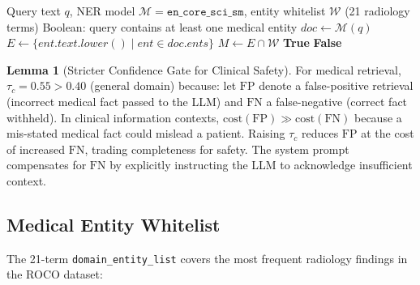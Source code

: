 \documentclass[12pt,a4paper]{article}
\theoremstyle{definition}
\newtheorem{lemma}[theorem]{Lemma}
\theoremstyle{remark}
\begin{document}
\begin{algorithm}[H]
\caption{Domain Entity NER Filtering (Medical Domain)}
\label{alg:ner_filter}
\begin{algorithmic}[1]
\Require Query text $q$, NER model $\mathcal{M} = \texttt{en\_core\_sci\_sm}$,
         entity whitelist $\mathcal{W}$ (21 radiology terms)
\Ensure Boolean: query contains at least one medical entity
\State $\textit{doc} \gets \mathcal{M}(q)$ 
\State $E \gets \{\textit{ent.text.lower}() \mid \textit{ent} \in \textit{doc}.\textit{ents}\}$
\State $M \gets E \cap \mathcal{W}$ 
  \State \Return \textbf{True} 
\Else
  \State \Return \textbf{False} 
\EndIf
\end{algorithmic}
\end{algorithm}

\begin{lemma}[Stricter Confidence Gate for Clinical Safety]
\label{lem:conf}
For medical retrieval, $\tau_c = 0.55 > 0.40$ (general domain) because:
let $\text{FP}$ denote a false-positive retrieval (incorrect medical
fact passed to the LLM) and $\text{FN}$ a false-negative (correct fact
withheld).
In clinical information contexts, $\text{cost}(\text{FP}) \gg \text{cost}(\text{FN})$
because a mis-stated medical fact could mislead a patient.
Raising $\tau_c$ reduces $\text{FP}$ at the cost of increased $\text{FN}$,
trading completeness for safety.
The system prompt compensates for $\text{FN}$ by explicitly instructing
the LLM to acknowledge insufficient context.
\end{lemma}

\subsection{Medical Entity Whitelist}

The 21-term \texttt{domain\_entity\_list} covers the most frequent
radiology findings in the ROCO dataset:
\end{document}
